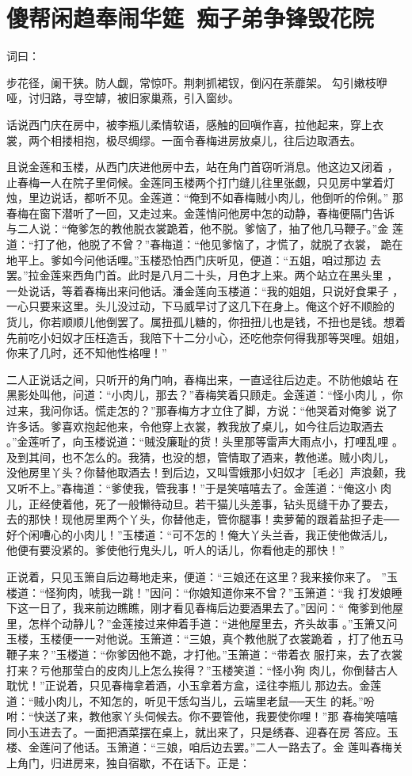 \chapter{傻帮闲趋奉闹华筵~痴子弟争锋毁花院}

词曰：

步花径，阑干狭。防人觑，常惊吓。荆刺抓裙钗，倒闪在荼蘼架。
勾引嫩枝咿哑，讨归路，寻空罅，被旧家巢燕，引入窗纱。

话说西门庆在房中，被李瓶儿柔情软语，感触的回嗔作喜，拉他起来，穿上衣
裳，两个相搂相抱，极尽绸缪。一面令春梅进房放桌儿，往后边取酒去。

且说金莲和玉楼，从西门庆进他房中去，站在角门首窃听消息。他这边又闭着
，止春梅一人在院子里伺候。金莲同玉楼两个打门缝儿往里张觑，只见房中掌着灯
烛，里边说话，都听不见。金莲道：“俺到不如春梅贼小肉儿，他倒听的伶俐。”
那春梅在窗下潜听了一回，又走过来。金莲悄问他房中怎的动静，春梅便隔门告诉
与二人说：“俺爹怎的教他脱衣裳跪着，他不脱。爹恼了，抽了他几马鞭子。”金
莲道：“打了他，他脱了不曾？”春梅道：“他见爹恼了，才慌了，就脱了衣裳，
跪在地平上。爹如今问他话哩。”玉楼恐怕西门庆听见，便道：“五姐，咱过那边
去罢。”拉金莲来西角门首。此时是八月二十头，月色才上来。两个站立在黑头里
，一处说话，等着春梅出来问他话。潘金莲向玉楼道：“我的姐姐，只说好食果子
，一心只要来这里。头儿没过动，下马威早讨了这几下在身上。俺这个好不顺脸的
货儿，你若顺顺儿他倒罢了。属扭孤儿糖的，你扭扭儿也是钱，不扭也是钱。想着
先前吃小妇奴才压枉造舌，我陪下十二分小心，还吃他奈何得我那等哭哩。姐姐，
你来了几时，还不知他性格哩！”

二人正说话之间，只听开的角门响，春梅出来，一直迳往后边走。不防他娘站
在黑影处叫他，问道：“小肉儿，那去？”春梅笑着只顾走。金莲道：“怪小肉儿
，你过来，我问你话。慌走怎的？”那春梅方才立住了脚，方说：“他哭着对俺爹
说了许多话。爹喜欢抱起他来，令他穿上衣裳，教我放了桌儿，如今往后边取酒去
。”金莲听了，向玉楼说道：“贼没廉耻的货！头里那等雷声大雨点小，打哩乱哩
。及到其间，也不怎么的。我猜，也没的想，管情取了酒来，教他递。贼小肉儿，
没他房里丫头？你替他取酒去！到后边，又叫雪娥那小妇奴才［毛必］声浪颡，我
又听不上。”春梅道：“爹使我，管我事！”于是笑嘻嘻去了。金莲道：“俺这小
肉儿，正经使着他，死了一般懒待动旦。若干猫儿头差事，钻头觅缝干办了要去，
去的那快！现他房里两个丫头，你替他走，管你腿事！卖萝葡的跟着盐担子走──
好个闲嘈心的小肉儿！”玉楼道：“可不怎的！俺大丫头兰香，我正使他做活儿，
他便有要没紧的。爹使他行鬼头儿，听人的话儿，你看他走的那快！”

正说着，只见玉箫自后边蓦地走来，便道：“三娘还在这里？我来接你来了。
”玉楼道：“怪狗肉，唬我一跳！”因问：“你娘知道你来不曾？”玉箫道：“我
打发娘睡下这一日了，我来前边瞧瞧，刚才看见春梅后边要酒果去了。”因问：“
俺爹到他屋里，怎样个动静儿？”金莲接过来伸着手道：“进他屋里去，齐头故事
。”玉箫又问玉楼，玉楼便一一对他说。玉箫道：“三娘，真个教他脱了衣裳跪着
，打了他五马鞭子来？”玉楼道：“你爹因他不跪，才打他。”玉箫道：“带着衣
服打来，去了衣裳打来？亏他那莹白的皮肉儿上怎么挨得？”玉楼笑道：“怪小狗
肉儿，你倒替古人耽忧！”正说着，只见春梅拿着酒，小玉拿着方盒，迳往李瓶儿
那边去。金莲道：“贼小肉儿，不知怎的，听见干恁勾当儿，云端里老鼠──天生
的耗。”吩咐：“快送了来，教他家丫头伺候去。你不要管他，我要使你哩！”那
春梅笑嘻嘻同小玉进去了。一面把酒菜摆在桌上，就出来了，只是绣春、迎春在房
答应。玉楼、金莲问了他话。玉箫道：“三娘，咱后边去罢。”二人一路去了。金
莲叫春梅关上角门，归进房来，独自宿歇，不在话下。正是：

